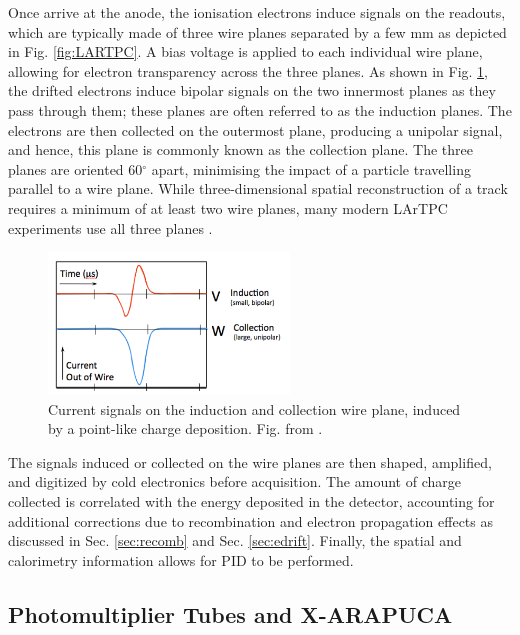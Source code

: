 Once arrive at the anode, the ionisation electrons induce signals on the readouts, which are typically made of three wire planes separated by a few mm as depicted in Fig. \ref{fig:LARTPC}.
A bias voltage is applied to each individual wire plane, allowing for electron transparency across the three planes.
As shown in Fig. \ref{fig:wire_current}, the drifted electrons induce bipolar signals on the two innermost planes as they pass through them; these planes are often referred to as the induction planes. 
The electrons are then collected on the outermost plane, producing a unipolar signal, and hence, this plane is commonly known as the collection plane.
The three planes are oriented 60$^{\circ}$ apart, minimising the impact of a particle travelling parallel to a wire plane.
While three-dimensional spatial reconstruction of a track requires a minimum of at least two wire planes, many modern LArTPC experiments use all three planes \cite{argoneut, icarus_det, ubooneDet, sbnd_det, protodune, dunefd_det}.
\begin{figure}[htp] 
\centering    
\includegraphics[width=0.57\textwidth]{wire_current}
\caption[wire_current]{
Current signals on the induction and collection wire plane, induced by a point-like charge deposition.
Fig. from \cite{argoneut}.
\hfill
\break
}
\label{fig:wire_current}
\end{figure}

The signals induced or collected on the wire planes are then shaped, amplified, and digitized by cold electronics before acquisition. 
The amount of charge collected is correlated with the energy deposited in the detector, accounting for additional corrections due to recombination and electron propagation effects as discussed in Sec. \ref{sec:recomb} and Sec. \ref{sec:edrift}. 
Finally, the spatial and calorimetry information allows for PID to be performed.


\subsection{Photomultiplier Tubes and X-ARAPUCA}


